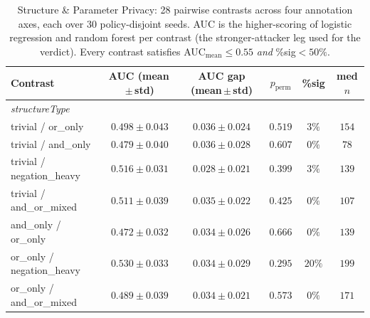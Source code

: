 \begin{table}[t]
  \centering
  \caption{Structure \& Parameter Privacy: 28 pairwise contrasts across four annotation
    axes, each over 30 policy-disjoint seeds. AUC is the higher-scoring of logistic
    regression and random forest per contrast (the stronger-attacker leg used for
    the verdict). Every contrast satisfies AUC$_{\text{mean}}\le 0.55$ \emph{and}
    \%sig${}<50\%$.}
  \label{tab:spp-contrasts}
  \begin{tabular}{lccccc}
    \toprule
    Contrast & AUC (mean\,$\pm$\,std) & AUC gap (mean\,$\pm$\,std) & $p_{\mathrm{perm}}$ & \%sig & med $n$ \\
    \midrule
    \multicolumn{6}{l}{\textit{structureType}} \\
    trivial / or\_only                & $0.498 \pm 0.043$ & $0.036 \pm 0.024$ & $0.519$ & $3\%$  & $154$ \\
    trivial / and\_only                & $0.479 \pm 0.040$ & $0.036 \pm 0.028$ & $0.607$ & $0\%$  & $78$  \\
    trivial / negation\_heavy          & $0.516 \pm 0.031$ & $0.028 \pm 0.021$ & $0.399$ & $3\%$  & $139$ \\
    trivial / and\_or\_mixed           & $0.511 \pm 0.039$ & $0.035 \pm 0.022$ & $0.425$ & $0\%$  & $107$ \\
    and\_only / or\_only              & $0.472 \pm 0.032$ & $0.034 \pm 0.026$ & $0.666$ & $0\%$  & $139$ \\
    or\_only / negation\_heavy        & $0.530 \pm 0.033$ & $0.034 \pm 0.029$ & $0.295$ & $20\%$ & $199$ \\
    or\_only / and\_or\_mixed         & $0.489 \pm 0.039$ & $0.034 \pm 0.021$ & $0.573$ & $0\%$  & $171$ \\

\end{tabular}
\end{table}
